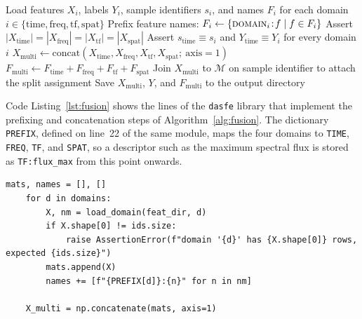 \begin{algorithm}[!htbp]
	\caption{Multi-domain feature fusion procedure.}
	\label{alg:fusion}
	\DontPrintSemicolon
	Load features $X_i$, labels $Y_i$, sample identifiers $s_i$, and names $F_i$ for each domain $i \in \{\mathrm{time, freq, tf, spat}\}$\;
	Prefix feature names: $F_i \leftarrow \{\textsc{domain}_i\!:\!f \mid f \in F_i\}$\;
	Assert $|X_{\mathrm{time}}| = |X_{\mathrm{freq}}| = |X_{\mathrm{tf}}| = |X_{\mathrm{spat}}|$\;
	Assert $s_{\mathrm{time}} \equiv s_i$ and $Y_{\mathrm{time}} \equiv Y_i$ for every domain $i$\;
	$X_{\mathrm{multi}} \leftarrow \mathrm{concat}(X_{\mathrm{time}}, X_{\mathrm{freq}}, X_{\mathrm{tf}}, X_{\mathrm{spat}};\ \mathrm{axis}=1)$\;
	$F_{\mathrm{multi}} \leftarrow F_{\mathrm{time}} + F_{\mathrm{freq}} + F_{\mathrm{tf}} + F_{\mathrm{spat}}$\;
	Join $X_{\mathrm{multi}}$ to $\mathcal{M}$ on sample identifier to attach the split assignment\;
	Save $X_{\mathrm{multi}}$, $Y$, and $F_{\mathrm{multi}}$ to the output directory\;
\end{algorithm}

Code Listing~\ref{lst:fusion} shows the lines of the \texttt{dasfe} library that implement the prefixing and concatenation steps of Algorithm~\ref{alg:fusion}. The dictionary \texttt{PREFIX}, defined on line~22 of the same module, maps the four domains to \texttt{TIME}, \texttt{FREQ}, \texttt{TF}, and \texttt{SPAT}, so a descriptor such as the maximum spectral flux is stored as \texttt{TF:flux\_max} from this point onwards.

\begin{lstlisting}[style=dasfe, firstnumber=41, caption={Domain prefixing and concatenation in \texttt{dasfe/fusion.py}, lines 41--49 (Equation~(\ref{eq:fusion})).}, label={lst:fusion}]
    mats, names = [], []
    for d in domains:
        X, nm = load_domain(feat_dir, d)
        if X.shape[0] != ids.size:
            raise AssertionError(f"domain '{d}' has {X.shape[0]} rows, expected {ids.size}")
        mats.append(X)
        names += [f"{PREFIX[d]}:{n}" for n in nm]

    X_multi = np.concatenate(mats, axis=1)
\end{lstlisting}

